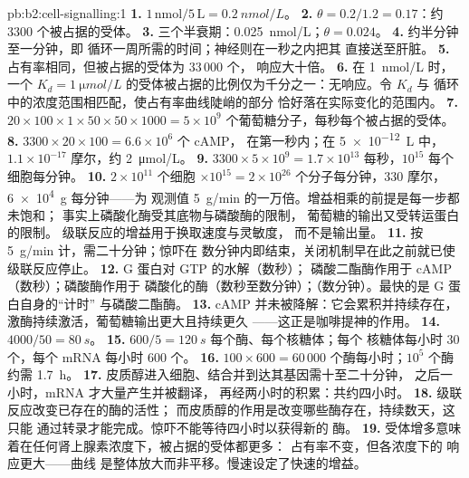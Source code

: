 \begin{solution}{pb:b2:cell-signalling:1}
\textbf{1.} $1\,\text{nmol}/5\,\text{L} = \qty{0.2}{nmol/L}$。
\textbf{2.} $\theta = 0.2/1.2 = 0.17$：约 3300 个被占据的受体。
\textbf{3.} 三个半衰期：\qty{0.025}{nmol/L}；$\theta = 0.024$。
\textbf{4.} 约半分钟至一分钟，即
循环一周所需的时间；神经则在一秒之内把其
直接送至肝脏。
\textbf{5.} 占有率相同，但被占据的受体为 $33\,000$ 个，
响应大十倍。
\textbf{6.} 在 \qty{1}{nmol/L} 时，一个 $K_d = \qty{1}{\micro
mol/L}$ 的受体被占据的比例仅为千分之一：无响应。令 $K_d$ 与
循环中的浓度范围相匹配，使占有率曲线陡峭的部分
恰好落在实际变化的范围内。
\textbf{7.} $20\times 100\times 1\times 50\times 50\times 1000 =
5\times 10^{9}$ 个葡萄糖分子，每秒每个被占据的受体。
\textbf{8.} $3300\times 20\times 100 = 6.6\times 10^{6}$ 个 cAMP，
在第一秒内；在 \qty{5e-12}{L} 中，$1.1\times 10^{-17}$ 摩尔，约
\qty{2}{\micro mol/L}。
\textbf{9.} $3300\times 5\times 10^{9} = 1.7\times 10^{13}$ 每秒，$10^{15}$
每个细胞每分钟。
\textbf{10.} $2\times 10^{11}$ 个细胞 $\times 10^{15} = 2\times
10^{26}$ 个分子每分钟，330 摩尔，\qty{6e4}{g} 每分钟——为
观测值 \qty{5}{g/min} 的一万倍。增益相乘的前提是每一步都未饱和；
事实上磷酸化酶受其底物与磷酸酶的限制，
葡萄糖的输出又受转运蛋白的限制。
级联反应的增益用于换取速度与灵敏度，
而不是输出量。
\textbf{11.} 按 \qty{5}{g/min} 计，需二十分钟；惊吓在
数分钟内即结束，关闭机制早在此之前就已使级联反应停止。
\textbf{12.} G 蛋白对 GTP 的水解（数秒）；
磷酸二酯酶作用于 cAMP（数秒）；磷酸酶作用于
磷酸化的酶（数秒至数分钟）；（数分钟）。最快的是 G 蛋白自身的“计时”
与磷酸二酯酶。
\textbf{13.} cAMP 并未被降解：它会累积并持续存在，
激酶持续激活，葡萄糖输出更大且持续更久
——这正是咖啡提神的作用。
\textbf{14.} $4000/50 = \qty{80}{s}$。
\textbf{15.} $600/5 = \qty{120}{s}$ 每个酶、每个核糖体；每个
核糖体每小时 30 个，每个 mRNA 每小时 600 个。
\textbf{16.} $100\times 600 = 60\,000$ 个酶每小时；$10^{5}$ 个酶
约需 \qty{1.7}{h}。
\textbf{17.} 皮质醇进入细胞、结合并到达其基因需十至二十分钟，
之后一小时，mRNA 才大量产生并被翻译，
再经两小时的积累：共约四小时。
\textbf{18.} 级联反应改变已存在的酶的活性；
而皮质醇的作用是改变哪些酶存在，持续数天，这只能
通过转录才能完成。惊吓不能等待四小时以获得新的
酶。
\textbf{19.} 受体增多意味着在任何肾上腺素浓度下，被占据的受体都更多：
占有率不变，但各浓度下的
响应更大——曲线
是整体放大而非平移。慢速设定了快速的增益。

\end{solution}
